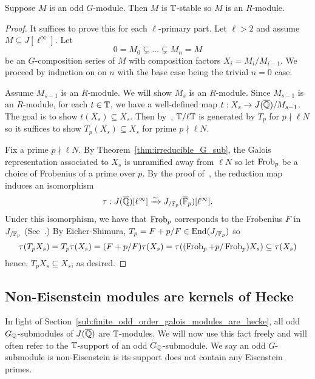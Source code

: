 \documentclass{article}
\begin{document}
\begin{theorem}\label{thm:G_modules_are_Hecke}
    Suppose $M$ is an odd $G$-module. Then $M$ is $\mathbb{T}$-stable so $M$ is
    an $R$-module.
\end{theorem}
\begin{proof}
    It suffices to prove this for each $\ell$-primary part. Let $\ell>2$ and
    assume $M\subseteq J[\ell^\infty]$. Let
    \[
        0 = M_0 \subsetneq \ldots \subsetneq M_n = M
    \]
    be an $G$-composition series of $M$ with composition factors $X_i =
    M_i/M_{i-1}$. We proceed by induction on on $n$ with the base
    case being the trivial $n=0$ case. 
    
    Assume $M_{s-1}$ is an $R$-module. We will show $M_s$ is an $R$-module.
    Since $M_{s-1}$ is an $R$-module, for each $t\in \mathbb{T}$, we have a
    well-defined map $t:X_s\to J(\overline{\mathbb{Q}})/M_{s-1}$. The goal is to show
    $t(X_s)\subseteq X_s$. Then by~\cite[Proposition 2]{ribet:mult_p_finite},
    $\mathbb{T}/\ell \mathbb{T}$ is generated by $T_p$ for $p\nmid \ell N$ so it suffices to
    show $T_p(X_s)\subseteq X_s$ for prime $p\nmid \ell N$.

    Fix a prime $p\nmid \ell N$. By Theorem~\ref{thm:irreducible_G_sub},
    the Galois representation associated to $X_s$ is unramified away from $\ell
    N$ so let $\operatorname{Frob}_p$ be a choice of Frobenius of a prime over $p$. By the
    proof of~\cite[Lemma 12.6.2]{ribet-stein:mod}, the reduction map induces an
    isomorphism
    \[
        \tau:J(\overline{\mathbb{Q}})[\ell^\infty] \xrightarrow{\sim} J_{/\mathbb{F}_p} (\overline{\mathbb{F}}_p)[\ell^\infty].
    \]
    Under this isomorphism, we have that $\operatorname{Frob}_p$ corresponds to the Frobenius
    $F$ in $J_{/\mathbb{F}_p}$ (See~\cite[\S 5.3]{ribet-stein:serre}.) By
    Eicher-Shimura, $T_p = F+p/F\in \operatorname{End}(J_{/\mathbb{F}_p})$ so
    \[
    \tau(T_p X_s) 
    = T_p\tau(X_s) 
    = (F+p/F)\tau(X_s)
    = \tau((\operatorname{Frob}_p+p/\operatorname{Frob}_p)X_s)
    \subseteq \tau(X_s)
    \]
    hence, $T_p X_s\subseteq X_s$, as desired.
\end{proof}


\subsection{Non-Eisenstein modules are kernels of Hecke}%
\label{sub:non_eisenstein_modules_are_kernels_of_hecke}

In light of Section~\ref{sub:finite_odd_order_galois_modules_are_hecke}, all
odd $G_{\mathbb{Q}}$-submodules of $J(\overline{\mathbb{Q}})$ are $\mathbb{T}$-modules. We will now
use this fact freely and will often refer to the $\mathbb{T}$-support of an odd
$G_{\mathbb{Q}}$-submodule. We say an odd $G$-submodule is non-Eisenstein is its
support does not contain any Eisenstein primes.
\end{document}
